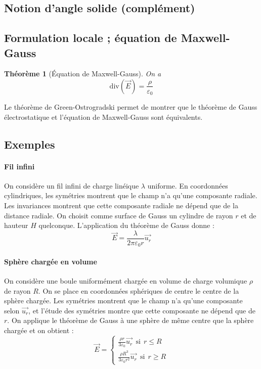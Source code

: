 \documentclass[french]{book}
\theoremstyle{plain}
\newtheorem{thm}{Théorème}
\theoremstyle{definition}
\theoremstyle{remark}
\renewcommand{\div}{\text{div}}
\begin{document}
\subsection{Notion d'angle solide (complément)}
\subsection{Formulation locale ; équation de Maxwell-Gauss}
\begin{thm}[Équation de Maxwell-Gauss]
	On a $$\div(\overrightarrow{E})=\frac{\rho}{\varepsilon_0}$$
\end{thm}
Le théorème de Green-Ostrogradski permet de montrer que le théorème de Gauss électrostatique et l'équation de Maxwell-Gauss sont équivalents.
\subsection{Exemples}
\paragraph{Fil infini}On considère un fil infini de charge linéique $\lambda$ uniforme. En coordonnées cylindriques, les symétries montrent que le champ n'a qu'une composante radiale. Les invariances montrent que cette composante radiale ne dépend que de la distance radiale. On choisit comme surface de Gauss un cylindre de rayon $r$ et de hauteur $H$ quelconque. L'application du théorème de Gauss donne : $$\overrightarrow{E}=\frac{\lambda}{2\pi\varepsilon_0 r}\overrightarrow{u_r}$$
\paragraph{Sphère chargée en volume}On considère une boule uniformément chargée en volume de charge volumique $\rho$ de rayon $R$. On se place en coordonnées sphériques de centre le centre de la sphère chargée. Les symétries montrent que le champ n'a qu'une composante selon $\overrightarrow{u_r}$, et l'étude des symétries montre que cette composante ne dépend que de $r$. On applique le théorème de Gauss à une sphère de même centre que la sphère chargée et on obtient : $$\overrightarrow{E}=\begin{cases}
	\displaystyle\frac{\rho r}{3\varepsilon_0}\overrightarrow{u_r} \ \ \text{si} \ \ r\leqslant R \\[4mm]
	\displaystyle \frac{\rho R^3}{3\varepsilon_0 r^2}\overrightarrow{u_r} \ \  \text{si} \ \ r\geqslant R 
\end{cases}$$
\end{document}
